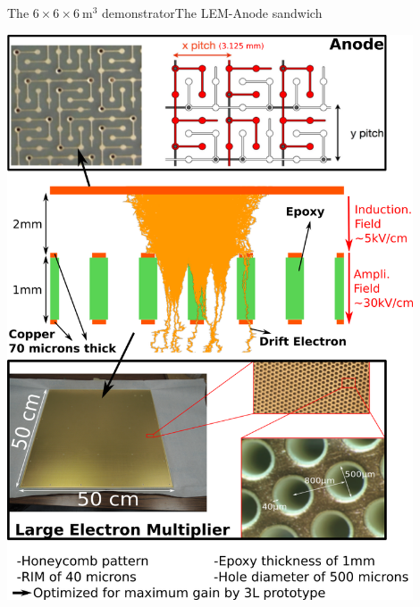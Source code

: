\documentclass[10pt]{beamer}
\begin{document}
\begin{frame}{The \texorpdfstring{$6 \times 6 \times \SI{6}{\meter\cubed}$}{666}
    		demonstrator}{The LEM-Anode sandwich}
\begin{scriptsize}
\begin{minipage}{0.48\textwidth}
	   			\includegraphics[width=0.9\textwidth]{figures/666/lem_anode.png}
	   		\end{minipage}
	   	\end{scriptsize} 
    \end{frame}
    
\end{document}
